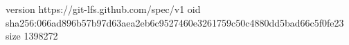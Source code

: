version https://git-lfs.github.com/spec/v1
oid sha256:066ad896b57b97d63aea2eb6c9527460e3261759c50c4880dd5bad66c5f0fe23
size 1398272
